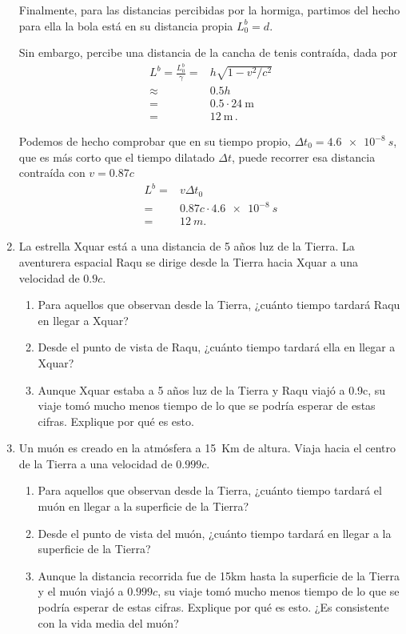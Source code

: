 \documentclass[11pt,a4paper]{article}
\begin{document}
\begin{enumerate}
Finalmente, para las distancias percibidas por la hormiga, partimos del hecho para ella la bola está en su distancia propia $L^b_0 = d$.

Sin embargo, percibe una distancia de la cancha de tenis contraída, dada por
\begin{align*}
    L^{b} = \frac{L^b_0}{\gamma} =& h\sqrt{1-v^2/c^2}\\
    \approx& 0.5 h\\
        =& 0.5\cdot \qty{24}{\m}\\
    =& \qty{12}{\m}\,.
\end{align*}

Podemos de hecho comprobar que en su tiempo propio, $\Delta t_0 = \qty{4.6e-8}{s}$, que es más corto que el tiempo dilatado $\Delta t$, puede recorrer esa distancia contraída con $v=0.87c$
\begin{align*}
    L^{b} = &v \Delta t_0 \\
    =&0.87 c \cdot \qty{4.6e-8}{s}\\
    =&\qty{12}{ m }.
\end{align*}

    
 \item La estrella Xquar está a una distancia de 5 años luz de la
Tierra. La aventurera espacial Raqu se dirige desde la Tierra
hacia Xquar a una velocidad de $0.9c$.
\begin{enumerate}[label=(\alph*)]
    \item Para aquellos que observan desde la Tierra, ¿cuánto tiempo tardará
Raqu en llegar a Xquar?
\item Desde el punto de vista de Raqu, ¿cuánto tiempo tardará ella
en llegar a Xquar?
\item Aunque Xquar estaba a 5 años luz de la Tierra
y Raqu viajó a 0.9c, su viaje tomó mucho
menos tiempo de lo que se podría esperar de estas cifras.
Explique por qué es esto.
\end{enumerate}


\item Un muón es creado en la atmósfera a 15~Km de altura. Viaja hacia el centro de la Tierra a una velocidad de $0.999c$. 
\label{item:muon}

\begin{enumerate}[label=(\alph*)]
    \item Para aquellos que observan desde la Tierra, ¿cuánto tiempo tardará
el muón en llegar a la superficie de la Tierra?
\item Desde el punto de vista del muón, ¿cuánto tiempo tardará
en llegar a la superficie de la Tierra?
\item Aunque la distancia recorrida fue de 15km hasta la superficie de la Tierra y el muón viajó a $0.999c$, 
su viaje tomó mucho
menos tiempo de lo que se podría esperar de estas cifras.
Explique por qué es esto. ¿Es consistente con la vida media del muón?
\end{enumerate}


\end{enumerate}
\end{document}
